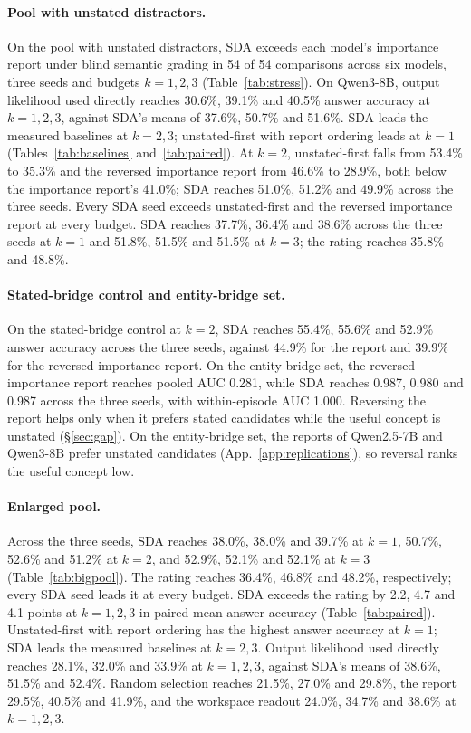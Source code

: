 \paragraph{Pool with unstated distractors.}
On the pool with unstated distractors, SDA exceeds each model's
importance report under blind semantic grading in 54 of 54 comparisons
across six models, three seeds and budgets $k=1,2,3$
(Table~\ref{tab:stress}).
On Qwen3-8B, output likelihood used directly reaches 30.6\%, 39.1\%
and 40.5\% answer accuracy at $k=1,2,3$, against SDA's means of
37.6\%, 50.7\% and 51.6\%.
SDA leads the measured baselines at $k=2,3$;
unstated-first with report ordering leads at $k=1$
(Tables~\ref{tab:baselines} and~\ref{tab:paired}). At $k=2$,
unstated-first falls from 53.4\% to 35.3\% and the reversed importance
report from 46.6\% to 28.9\%, both below the importance report's
41.0\%; SDA reaches 51.0\%, 51.2\% and 49.9\% across the three seeds.
Every SDA seed exceeds unstated-first and the reversed importance
report at every budget. SDA reaches 37.7\%, 36.4\% and 38.6\% across
the three seeds at $k=1$ and 51.8\%, 51.5\% and 51.5\% at $k=3$;
the rating reaches 35.8\% and 48.8\%.

\paragraph{Stated-bridge control and entity-bridge set.}
On the stated-bridge control at $k=2$, SDA reaches 55.4\%, 55.6\% and
52.9\% answer accuracy across the three seeds, against 44.9\% for the
report and 39.9\% for the reversed importance report. On the
entity-bridge set, the reversed importance report reaches pooled AUC
0.281, while SDA reaches 0.987, 0.980 and 0.987 across the three seeds,
with within-episode AUC 1.000. Reversing the report helps only when it
prefers stated candidates while the useful concept is unstated
(\S\ref{sec:gap}). On the entity-bridge set, the reports of Qwen2.5-7B
and Qwen3-8B prefer unstated candidates
(App.~\ref{app:replications}), so reversal ranks the useful concept low.

\paragraph{Enlarged pool.}
Across the three seeds, SDA reaches 38.0\%, 38.0\% and 39.7\% at
$k=1$, 50.7\%, 52.6\% and 51.2\% at $k=2$, and 52.9\%, 52.1\% and
52.1\% at $k=3$ (Table~\ref{tab:bigpool}).
The rating reaches 36.4\%, 46.8\% and 48.2\%, respectively;
every SDA seed leads it at every budget. SDA exceeds the rating by
2.2, 4.7 and 4.1 points at $k=1,2,3$ in paired mean answer accuracy
(Table~\ref{tab:paired}). Unstated-first with report ordering has the
highest answer accuracy at $k=1$; SDA leads the measured baselines at
$k=2,3$. Output likelihood used directly reaches 28.1\%, 32.0\% and
33.9\% at $k=1,2,3$, against SDA's means of 38.6\%, 51.5\% and 52.4\%.
Random selection reaches 21.5\%, 27.0\% and 29.8\%, the report
29.5\%, 40.5\% and 41.9\%, and the workspace readout 24.0\%, 34.7\%
and 38.6\% at $k=1,2,3$.

